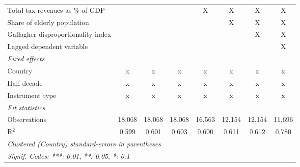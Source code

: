 \begin{tabular}{lccccccc}
   Total tax revenues as \% of GDP                                                           &                &                &                & X             & X       & X       & X\\  
   Share of elderly population                                                               &                &                &                &               & X       & X       & X\\  
   Gallagher disproportionality index                                                        &                &                &                &               &         & X       & X\\  
   Lagged dependent variable                                                                 &                &                &                &               &         &         & X\\  
   \emph{Fixed effects}\\
   Country                                                                                   & x              & x              & x              & x             & x       & x       & x\\  
   Half decade                                                                               & x              & x              & x              & x             & x       & x       & x\\  
   Instrument type                                                                           & x              & x              & x              & x             & x       & x       & x\\  
   \midrule \emph{Fit statistics}\\
   Observations                                                                              & 18,068         & 18,068         & 18,068         & 16,563        & 12,154  & 12,154  & 11,696\\  
   R$^2$                                                                                     & 0.599          & 0.601          & 0.603          & 0.600         & 0.611   & 0.612   & 0.780\\  
   \midrule
   \multicolumn{8}{l}{\emph{Clustered (Country) standard-errors in parentheses}}\\
   \multicolumn{8}{l}{\emph{Signif. Codes: ***: 0.01, **: 0.05, *: 0.1}}\\
\end{tabular}
\par\endgroup



